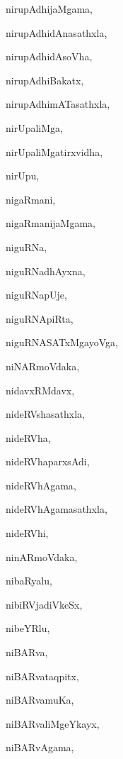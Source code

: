 \begin{multicols}{2}
{nirupAdhijaMgama}, \pageref{nirupAdhijaMgama}

{nirupAdhidAnasathxla}, \pageref{nirupAdhidAnasathxla}

{nirupAdhidAsoVha}, \pageref{nirupAdhidAsoVha}

{nirupAdhiBakatx}, \pageref{nirupAdhiBakatx}

{nirupAdhimATasathxla}, \pageref{nirupAdhimATasathxla}

{nirUpaliMga}, \pageref{nirUpaliMga}

{nirUpaliMgatirxvidha}, \pageref{nirUpaliMgatirxvidha}

{nirUpu}, \pageref{nirUpu}

{nigaRmani}, \pageref{nigaRmani}

{nigaRmanijaMgama}, \pageref{nigaRmanijaMgama}

{niguRNa}, \pageref{niguRNa}

{niguRNadhAyxna}, \pageref{niguRNadhAyxna}

{niguRNapUje}, \pageref{niguRNapUje}

{niguRNApiRta}, \pageref{niguRNApiRta}

{niguRNASATxMgayoVga}, \pageref{niguRNASATxMgayoVga}

{niNARmoVdaka}, \pageref{niNARmoVdaka}

{nidavxRMdavx}, \pageref{nidavxRMdavx}

{nideRVshasathxla}, \pageref{nideRVshasathxla}

{nideRVha}, \pageref{nideRVha}

{nideRVhaparxsAdi}, \pageref{nideRVhaparxsAdi}

{nideRVhAgama}, \pageref{nideRVhAgama}

{nideRVhAgamasathxla}, \pageref{nideRVhAgamasathxla}

{nideRVhi}, \pageref{nideRVhi}

{ninARmoVdaka}, \pageref{ninARmoVdaka}

{nibaRyalu}, \pageref{nibaRyalu}

{nibiRVjadiVkeSx}, \pageref{nibiRVjadiVkeSx}

{nibeYRlu}, \pageref{nibeYRlu}

{niBARva}, \pageref{niBARva}

{niBARvataqpitx}, \pageref{niBARvataqpitx}

{niBARvamuKa}, \pageref{niBARvamuKa}

{niBARvaliMgeYkayx}, \pageref{niBARvaliMgeYkayx}

{niBARvAgama}, \pageref{niBARvAgama}


\end{multicols}
